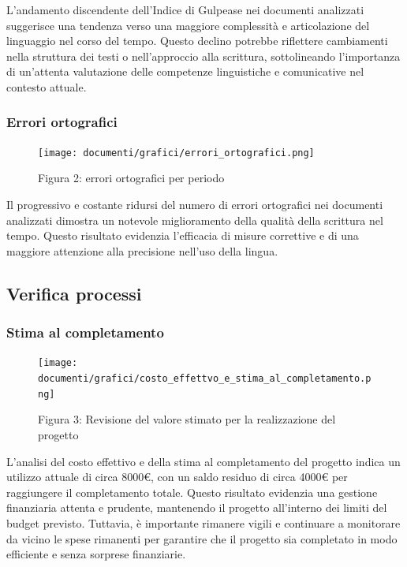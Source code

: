 \documentclass{article}
\begin{document}
{    L'andamento discendente dell'Indice di Gulpease nei documenti analizzati suggerisce una tendenza verso una maggiore complessità e articolazione del linguaggio nel corso del tempo. Questo declino potrebbe riflettere cambiamenti nella struttura dei testi o nell'approccio alla scrittura, sottolineando l'importanza di un'attenta valutazione delle competenze linguistiche e comunicative nel contesto attuale.



\subsubsection{Errori ortografici}
   \begin{figure}[H]
    \centering
    \texttt{[image: documenti/grafici/errori\_ortografici.png]}
     \caption{Figura 2: errori ortografici per periodo}
    \end{figure}
     Il progressivo e costante ridursi del numero di errori ortografici nei documenti analizzati dimostra un notevole miglioramento della qualità della scrittura nel tempo. Questo risultato evidenzia l'efficacia di misure correttive e di una maggiore attenzione alla precisione nell'uso della lingua.
\subsection{Verifica processi}
\subsubsection{Stima al completamento}
\begin{figure}[H]
    \centering
    \texttt{[image: documenti/grafici/costo\_effettvo\_e\_stima\_al\_completamento.png]}
    \caption{Figura 3: Revisione del valore stimato per la realizzazione del progetto}
    \end{figure}
    L'analisi del costo effettivo e della stima al completamento del progetto indica un utilizzo attuale di circa 8000€, con un saldo residuo di circa 4000€ per raggiungere il completamento totale. Questo risultato evidenzia una gestione finanziaria attenta e prudente, mantenendo il progetto all'interno dei limiti del budget previsto. Tuttavia, è importante rimanere vigili e continuare a monitorare da vicino le spese rimanenti per garantire che il progetto sia completato in modo efficiente e senza sorprese finanziarie.
}
\end{document}
